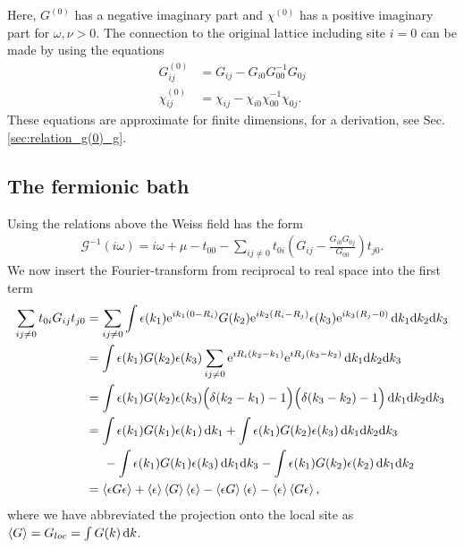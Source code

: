 \documentclass[12pt,a4paper]{scrartcl}
\numberwithin{equation}{section}
\begin{document}
Here, $G^{(0)}$ has a negative imaginary part and $\chi^{(0)}$ has a positive 
imaginary part for $\omega,\nu>0$.
The connection to the original lattice including site $i=0$ can be made by using the 
equations
\begin{align}
 G^{(0)}_{ij} &= G_{ij} - G_{i0}G^{-1}_{00}G_{0j} \\ 
 \chi^{(0)}_{ij} &= \chi_{ij} - \chi_{i0}\chi^{-1}_{00}\chi_{0j} .
\end{align}
These equations are approximate for finite dimensions, for a derivation,
see Sec.\ref{sec:relation_g(0)_g}.

\subsection{The fermionic bath}
Using the relations above the Weiss field has the form
\begin{align}
 \mathscr{G}^{-1}(i\omega) = i\omega + \mu - t_{00} - \sum_{ij\neq 0} t_{0i}  \left( G_{ij} - \frac{G_{i0} G_{0j} }{G_{00}} \right) t_{j0} .
\end{align}
We now insert the Fourier-transform from reciprocal to real space into the first term 
\begin{align}
 \sum_{ij\neq 0} t_{0i}  G_{ij} t_{j0} 
 &= \sum_{ij\neq 0} \int \epsilon(k_1)\mathrm{e}^{ik_1(0-R_i)}  G(k_2)\mathrm{e}^{ik_2(R_i-R_j)} \epsilon(k_3)\mathrm{e}^{ik_3(R_j-0)} \, \mathrm{d}k_1\mathrm{d}k_2\mathrm{d}k_3 \\
 &=  \int \epsilon(k_1)G(k_2)\epsilon(k_3)  \sum_{ij\neq 0} \mathrm{e}^{iR_i(k_2-k_1)}\mathrm{e}^{iR_j(k_3-k_2)} \, \mathrm{d}k_1\mathrm{d}k_2\mathrm{d}k_3 \\
 &=  \int \epsilon(k_1)G(k_2)\epsilon(k_3)  \Big(\delta(k_2-k_1)-1 \Big) \Big(\delta(k_3-k_2)-1 \Big) \, \mathrm{d}k_1\mathrm{d}k_2\mathrm{d}k_3 \\
 &=  \int \epsilon(k_1)G(k_1)\epsilon(k_1) \, \mathrm{d}k_1
                 +\int \epsilon(k_1)G(k_2)\epsilon(k_3) \, \mathrm{d}k_1\mathrm{d}k_2\mathrm{d}k_3 \nonumber \\
 & \hspace{0.5cm}  -\int \epsilon(k_1)G(k_1)\epsilon(k_3) \, \mathrm{d}k_1\mathrm{d}k_3
                 -\int \epsilon(k_1)G(k_2)\epsilon(k_2) \, \mathrm{d}k_1\mathrm{d}k_2 \\
%                 
&= \braket{\epsilon G \epsilon} + \braket{\epsilon} \braket{G} \braket{\epsilon} - \braket{\epsilon G} \braket{\epsilon}
                                                                                 - \braket{\epsilon}\braket{G\epsilon },
\end{align}
where we have abbreviated the projection onto the local site as $\braket{G}=G_{loc}=\int G(k) \, \mathrm{d}k$.
\end{document}
